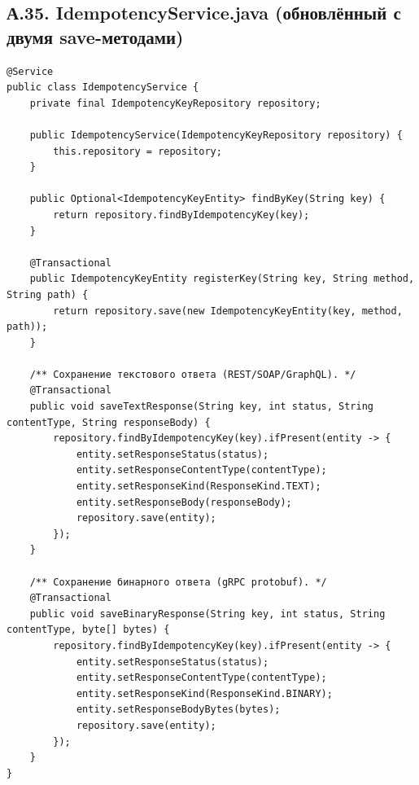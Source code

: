 \subsection*{А.35. IdempotencyService.java (обновлённый с двумя save-методами)}
\begin{lstlisting}[caption={Единая точка интеграции для всех транспортов}]
@Service
public class IdempotencyService {
    private final IdempotencyKeyRepository repository;

    public IdempotencyService(IdempotencyKeyRepository repository) {
        this.repository = repository;
    }

    public Optional<IdempotencyKeyEntity> findByKey(String key) {
        return repository.findByIdempotencyKey(key);
    }

    @Transactional
    public IdempotencyKeyEntity registerKey(String key, String method, String path) {
        return repository.save(new IdempotencyKeyEntity(key, method, path));
    }

    /** Сохранение текстового ответа (REST/SOAP/GraphQL). */
    @Transactional
    public void saveTextResponse(String key, int status, String contentType, String responseBody) {
        repository.findByIdempotencyKey(key).ifPresent(entity -> {
            entity.setResponseStatus(status);
            entity.setResponseContentType(contentType);
            entity.setResponseKind(ResponseKind.TEXT);
            entity.setResponseBody(responseBody);
            repository.save(entity);
        });
    }

    /** Сохранение бинарного ответа (gRPC protobuf). */
    @Transactional
    public void saveBinaryResponse(String key, int status, String contentType, byte[] bytes) {
        repository.findByIdempotencyKey(key).ifPresent(entity -> {
            entity.setResponseStatus(status);
            entity.setResponseContentType(contentType);
            entity.setResponseKind(ResponseKind.BINARY);
            entity.setResponseBodyBytes(bytes);
            repository.save(entity);
        });
    }
}
\end{lstlisting}

